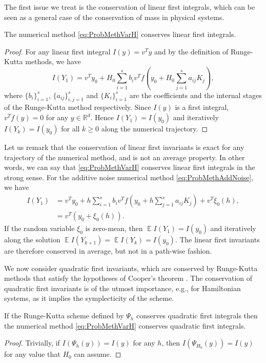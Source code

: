 \documentclass{siamart1116}
\numberwithin{theorem}{section}
\newcommand{\R}{\mathbb{R}}
\newcommand{\E}{\operatorname{\mathbb{E}}}
\newcommand{\sksum}{{\textstyle\sum}}
\newcommand{\corr}[1]{{\color{bordeaux}#1}}
\begin{document}
The first issue we treat is the conservation of linear first integrals, which can be seen as a general case of the conservation of mass in physical systems.
\begin{theorem}\label{thm:LinearInvariants} The numerical method \eqref{eq:ProbMethVarH} conserves linear first integrals.
\end{theorem}
\begin{proof} For any linear first integral $I(y) = v^T y$ and by the definition of Runge-Kutta methods, we have
	\begin{equation}
		I(Y_1) = v^T y_0 + H_0 \sksum_{i=1}^s b_iv^T f(y_0 + H_0\sksum_{j=1}^{s} a_{ij}K_j),
	\end{equation}
	where $\{b_i\}_{i=1}^s$, $\{a_{ij}\}_{i,j=1}^s$ and $\{K_i\}_{i=1}^s$ are the coefficients and the internal stages of the Runge-Kutta method respectively. Since $I(y)$ is a first integral, $v^T f(y) = 0$ for any $y \in \R^d$. Hence $I(Y_1)  = I(y_0)$ \corr{and iteratively $I(Y_k) = I(y_0)$ for all $k \geq 0$ along the numerical trajectory.}
\end{proof}
\begin{remark} Let us remark that the conservation of linear first invariants is exact for any trajectory of the numerical method, and is not an average property. In other words, we can say that \eqref{eq:ProbMethVarH} conserves linear first integrals in the strong sense. For the additive noise numerical method \eqref{eq:ProbMethAddNoise}, we have
	\begin{equation}
	\begin{aligned}
		I(Y_1) &= v^T y_0 + h \sksum_{i=1}^s b_iv^T f(y_0 + h\sksum_{j=1}^{s} a_{ij}K_j) + v^T \xi_0(h), \\
		&= v^T (y_0 + \xi_0(h)).
	\end{aligned}
	\end{equation}
	If the random variable $\xi_0$ is zero-mean, then $\E I(Y_1) = I(y_0)$ and iteratively along the solution $\E I(Y_{k+1}) = \E I(Y_k) = I(y_0)$. The linear first invariants are therefore conserved in average, but not in a path-wise fashion.
\end{remark}
We now consider quadratic first invariants, which are conserved by Runge-Kutta methods that satisfy the hypotheses of Cooper's theorem \cite{HLW06}. The conservation of quadratic first invariants is of the utmost importance, e.g., for Hamiltonian systems, as it implies the symplecticity of the scheme. 
\begin{theorem}\label{thm:QuadraticInvariants} If the Runge-Kutta scheme defined by $\Psi_h$ conserves quadratic first integrals then the numerical method \eqref{eq:ProbMethVarH} conserves quadratic first integrals.
\end{theorem}
\begin{proof} Trivially, if $I(\Psi_h(y)) = I(y)$ for any $h$, then $I(\Psi_{H_0}(y)) = I(y)$ for any value that $H_0$ can assume.
\end{proof}
\end{document}
